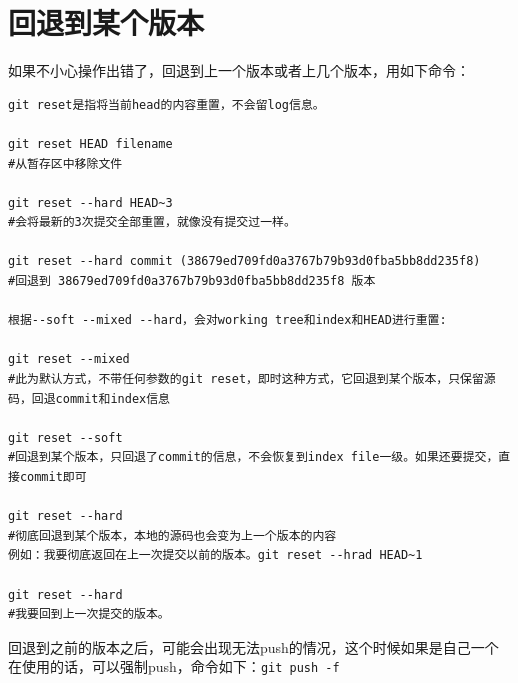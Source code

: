\documentclass[a4paper,12pt]{ctexbook}
\begin{document}
\section{回退到某个版本}
如果不小心操作出错了，回退到上一个版本或者上几个版本，用如下命令：
\begin{verbatim}
git reset是指将当前head的内容重置，不会留log信息。

git reset HEAD filename
#从暂存区中移除文件

git reset --hard HEAD~3
#会将最新的3次提交全部重置，就像没有提交过一样。

git reset --hard commit (38679ed709fd0a3767b79b93d0fba5bb8dd235f8)
#回退到 38679ed709fd0a3767b79b93d0fba5bb8dd235f8 版本

根据--soft --mixed --hard，会对working tree和index和HEAD进行重置:

git reset --mixed
#此为默认方式，不带任何参数的git reset，即时这种方式，它回退到某个版本，只保留源码，回退commit和index信息

git reset --soft
#回退到某个版本，只回退了commit的信息，不会恢复到index file一级。如果还要提交，直接commit即可

git reset --hard
#彻底回退到某个版本，本地的源码也会变为上一个版本的内容
例如：我要彻底返回在上一次提交以前的版本。git reset --hrad HEAD~1

git reset --hard
#我要回到上一次提交的版本。
\end{verbatim}
回退到之前的版本之后，可能会出现无法push的情况，这个时候如果是自己一个在使用的话，可以强制push，命令如下：\verb|git push -f|

\newpage
\end{document}

